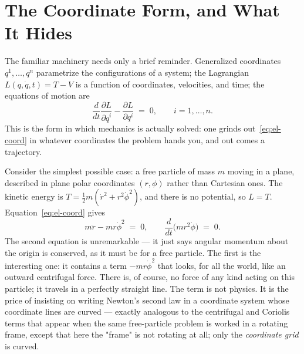 \section{The Coordinate Form, and What It Hides}
\label{sec:coordinate-form}

The familiar machinery needs only a brief reminder. Generalized
coordinates $q^1,\dots,q^n$ parametrize the configurations of a
system; the Lagrangian $L(q,\dot q,t) = T - V$ is a function of
coordinates, velocities, and time; the equations of motion are
\begin{equation}
  \frac{d}{dt}\frac{\partial L}{\partial \dot q^i}
  - \frac{\partial L}{\partial q^i} \;=\; 0,
  \qquad i=1,\dots,n.
  \label{eq:el-coord}
\end{equation}
This is the form in which mechanics is actually solved: one grinds
out~\eqref{eq:el-coord} in whatever coordinates the problem hands
you, and out comes a trajectory.

Consider the simplest possible case: a free particle of mass $m$
moving in a plane, described in plane polar coordinates $(r,\phi)$
rather than Cartesian ones. The kinetic energy is $T =
\tfrac12 m(\dot r^2 + r^2\dot\phi^2)$, and there is no potential, so
$L=T$. Equation~\eqref{eq:el-coord} gives
\begin{equation}
  m\ddot r - m r\dot\phi^2 \;=\; 0,
  \qquad
  \frac{d}{dt}\bigl(m r^2\dot\phi\bigr) \;=\; 0.
  \label{eq:polar-free}
\end{equation}
The second equation is unremarkable --- it just says angular
momentum about the origin is conserved, as it must be for a free
particle. The first is the interesting one: it contains a term
$-mr\dot\phi^2$ that looks, for all the world, like an outward
centrifugal force. There is, of course, no force of any kind acting
on this particle; it travels in a perfectly straight line. The term
is not physics. It is the price of insisting on writing Newton's
second law in a coordinate system whose coordinate lines are
curved --- exactly analogous to the centrifugal and Coriolis terms
that appear when the same free-particle problem is worked in a
rotating frame, except that here the "frame" is not rotating at all;
only the \emph{coordinate grid} is curved.

